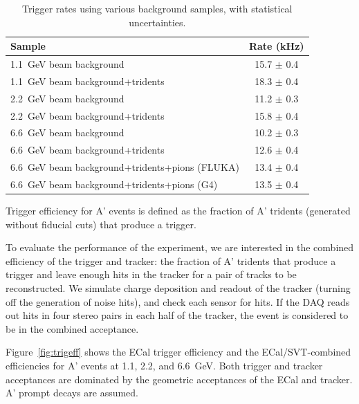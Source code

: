 \begin{table}
	\begin{tabular}{|l|c|}
		\hline
		Sample &  Rate (kHz)\\
		\hline
		1.1~GeV	beam background 				& 15.7 $\pm$ 0.4	\\
		1.1~GeV beam background+tridents			& 18.3 $\pm$ 0.4	\\
		2.2~GeV	beam background 				& 11.2 $\pm$ 0.3	\\
		2.2~GeV beam background+tridents			& 15.8 $\pm$ 0.4	\\
		6.6~GeV	beam background 				& 10.2 $\pm$ 0.3	\\
		6.6~GeV beam background+tridents			& 12.6 $\pm$ 0.4	\\
		6.6~GeV beam background+tridents+pions (FLUKA)	& 13.4 $\pm$ 0.4	\\
		6.6~GeV beam background+tridents+pions (G4)	& 13.5 $\pm$ 0.4	\\
		\hline
	\end{tabular}
	\caption{ {\small Trigger rates using various background samples, with statistical uncertainties. }
	\label{tab:trigrates}}
\end{table}

Trigger efficiency for A' events is defined as the fraction of A' tridents (generated without fiducial cuts) that produce a trigger.

To evaluate the performance of the experiment, we are interested in the combined efficiency of the trigger and tracker: the fraction of A' tridents that produce a trigger and leave enough hits in the tracker for a pair of tracks to be reconstructed.
We simulate charge deposition and readout of the tracker (turning off the generation of noise hits), and check each sensor for hits. 
If the DAQ reads out hits in four stereo pairs in each half of the tracker, the event is considered to be in the combined acceptance.

Figure~\ref{fig:trigeff} shows the ECal trigger efficiency and the ECal/SVT-combined efficiencies for A' events at 1.1, 2.2, and 6.6~GeV. 
Both trigger and tracker acceptances are dominated by the geometric acceptances of the ECal and tracker.
A' prompt decays are assumed.

